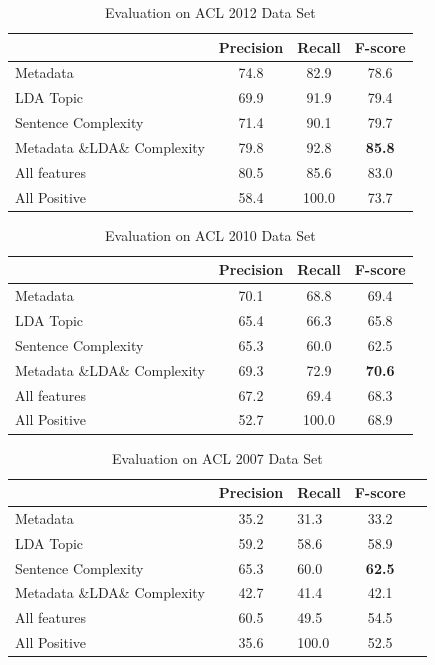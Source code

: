 \documentclass[11pt,letterpaper]{article}
\begin{document}
\begin{table}
\begin{center}
\begin{tabular}{|p{2cm}|c|c|c|}
\hline 
& \bf Precision & \bf Recall & \bf F-score \\ \hline
Metadata	& 74.8	& 82.9	& 78.6\\ \hline
LDA Topic &	69.9	&91.9&	79.4\\ \hline
Sentence Complexity	& 71.4	& 90.1 &	79.7\\ \hline
Metadata \&LDA\& Complexity	& 79.8	& 92.8 & \bf 85.8\\ \hline
All features	& 80.5	& 85.6	& 83.0\\ \hline
All Positive	& 58.4	& 100.0	& 73.7\\\hline
\end{tabular}
\end{center}
\label{tab:2012}
\caption{Evaluation on ACL 2012 Data Set}
\end{table}


\begin{table}
\begin{center}
\begin{tabular}{|p{2cm}|c|c|c|}
\hline 
& \bf Precision & \bf Recall & \bf F-score \\ \hline
Metadata	&70.1&68.8&69.4\\ \hline
LDA Topic &65.4&66.3&65.8\\ \hline
Sentence Complexity	&65.3&60.0&62.5\\ \hline
Metadata \&LDA\& Complexity	&69.3&72.9&\bf 70.6\\ \hline
All features	&67.2&69.4&68.3\\ \hline
All Positive	&52.7& 100.0	& 68.9\\\hline
\end{tabular}
\end{center}
\label{tab:2010}
\caption{Evaluation on ACL 2010 Data Set}
\end{table}

\begin{table}
\begin{center}
\begin{tabular}{|p{2cm}|cl|c|c|}
\hline 
& \bf Precision & \bf Recall & \bf F-score \\ \hline
Metadata	& 35.2	& 31.3	& 33.2\\ \hline
LDA Topic &	59.2	& 58.6&	58.9\\ \hline
Sentence Complexity	& 65.3	& 60.0 &	\bf 62.5\\ \hline
Metadata \&LDA\& Complexity	& 42.7	& 41.4 & 42.1\\ \hline
All features	& 60.5	& 49.5	& 54.5 \\ \hline
All Positive	& 35.6	& 100.0	& 52.5\\ \hline
\end{tabular}
\end{center}
\label{tab:2007}
\caption{Evaluation on ACL 2007 Data Set}
\end{table}
\end{document}
